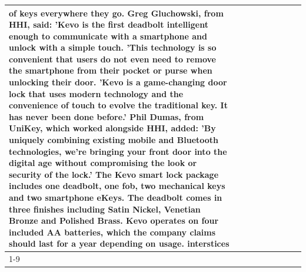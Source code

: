 \begin{table}[H]
\begin{tabular}{lllrlllll}
of keys everywhere they go. Greg Gluchowski, from HHI, said: 'Kevo is the first deadbolt intelligent enough to communicate with a smartphone and unlock with a simple touch. 'This technology is so convenient that users do not even need to remove the smartphone from their pocket or purse when unlocking their door. 'Kevo is a game-changing door lock that uses modern technology and the convenience of touch to evolve the traditional key. It has never been done before.' Phil Dumas, from UniKey, which worked alongside HHI, added: 'By uniquely combining existing mobile and Bluetooth technologies, we’re bringing your front door into the digital age without compromising the look or security of the lock.' The Kevo smart lock package includes one deadbolt, one fob, two mechanical keys and two smartphone eKeys. The deadbolt comes in three finishes including Satin Nickel, Venetian Bronze and Polished Brass. Kevo operates on four included AA batteries, which the company claims should last for a year depending on usage. interstices \\
\cline{1-9}

\end{tabular}
\end{table}
